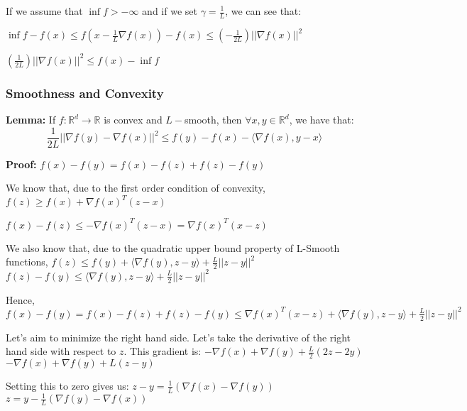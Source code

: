 If we assume that $\inf f > -\infty$ and if we set $\gamma = \frac{1}{L}$, we can see that: \newline 

$\inf f - f(x) \leq f(x - \frac{1}{L} \nabla f(x)) - f(x) \leq (-\frac{1}{2L}) ||\nabla f(x)||^2$ \newline 

$(\frac{1}{2L}) ||\nabla f(x)||^2 \leq f(x) - \inf f$


\subsubsection{Smoothness and Convexity}
\noindent \textbf{Lemma:} If $f: \mathbb{R}^d \rightarrow \mathbb{R}$ is convex and $L-$smooth, then $\forall x, y \in \mathbb{R}^d$, we have that: 
\begin{equation}
    \frac{1}{2L} ||\nabla f(y) - \nabla f(x)||^2 \leq f(y) - f(x) - \langle \nabla f(x), y - x \rangle
\end{equation}

\noindent \textbf{Proof:} 
$f(x) - f(y) = f(x) - f(z) + f(z) - f(y)$ \newline 

\noindent We know that, due to the first order condition of convexity, $f(z) \geq f(x) + \nabla f(x)^T (z - x)$

\noindent $f(x) - f(z) \leq -\nabla f(x)^T (z - x) = \nabla f(x)^T(x - z)$ 

\noindent We also know that, due to the quadratic upper bound property of L-Smooth functions, \newline 
$f(z) \leq f(y) + \langle \nabla f(y), z - y \rangle + \frac{L}{2} ||z - y||^2$ \newline 
$f(z) - f(y) \leq \langle \nabla f(y), z - y \rangle + \frac{L}{2} ||z - y||^2$ \newline 

Hence, $f(x) - f(y) = f(x) - f(z) + f(z) - f(y) \leq \nabla f(x)^T(x - z) + \langle \nabla f(y), z - y \rangle + \frac{L}{2} ||z - y||^2$

\noindent Let's aim to minimize the right hand side. \newline 
Let's take the derivative of the right hand side with respect to $z$. This gradient is: \newline 
$-\nabla f(x) + \nabla f(y) + \frac{L}{2} (2z -2y)$ \newline 
$-\nabla f(x) + \nabla f(y) + L (z - y)$

Setting this to zero gives us: $z - y = \frac{1}{L}(\nabla f(x) - \nabla f(y))$ \newline 
$z = y - \frac{1}{L}(\nabla f(y) - \nabla f(x))$

